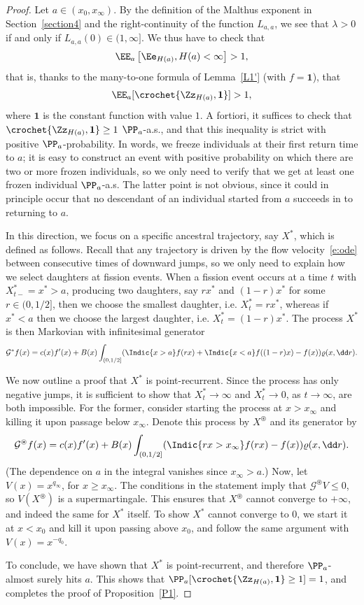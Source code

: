 \begin{proof}
Let $a \in (x_0,x_\infty)$. By the definition of the Malthus exponent in Section~\ref{section4} and the right-continuity of the function $L_{a,a}$, we see that $\lambda>0$ if and only if $L_{a,a}(0)\in(1,\infty]$. We thus have to check that
\[
\EE_a\left[\Ee_{H(a)}, H(a)<\infty\right]>1,
\]
that is, thanks to the many-to-one formula of Lemma~\ref{L1'} (with $f=\mathbf{1}$), that
\[
\EE_a[\crochet{\Zz_{H(a)}, \mathbf{1}}]>1,
\]
where $\mathbf{1}$ is the constant function with value $1$. A fortiori, it suffices to check that $\crochet{\Zz_{H(a)}, \mathbf{1}}\geq 1$ $\PP_a$-a.s., and that this inequality is strict with positive $\PP_a$-probability. In words, we freeze individuals at their first return time to $a$; it is easy to construct an event with positive probability on which there are two or more frozen individuals, so we only need to verify that we get at least one frozen individual $\PP_a$-a.s. The latter point is not obvious, since it could in principle occur that no descendant of an individual started from $a$ succeeds in to returning to $a$.

In this direction, we focus on a specific ancestral trajectory, say $X^*$, which is defined as follows. Recall that any trajectory is driven by the flow velocity~\eqref{e:ode} between consecutive times of downward jumps, so we only need to explain how we select daughters at fission events. When a fission event occurs at a time $t$ with $X^*_{t-}=x^*>a$, producing two daughters, say $rx^*$ and $(1-r)x^*$ for some $r\in(0,1/2]$, then we choose the smallest daughter, i.e. $X^*_t=rx^*$, whereas if $x^*<a$ then we choose the largest daughter, i.e. $X^*_t=(1-r)x^*$. The process $X^*$ is then Markovian with infinitesimal generator
\[
{\mathcal G}^*f(x)=c(x) f'(x) +B(x) \int_{(0,1/2]} (\Indic{x>a} f(rx) + \Indic{x<a}f((1-r)x) -f(x))\varrho(x,\dd r).
\]

We now outline a proof that $X^*$ is point-recurrent. Since the process has only negative jumps, it is sufficient to show that $X^*_t \to \infty$ and $X^*_t \to 0$, as $t\to\infty$, are both impossible. For the former, consider starting the process at $x>x_\infty$ and killing it upon passage below $x_\infty$. Denote this process by $X^\circledast$ and its generator by
\[
{\mathcal G}^\circledast f(x)=c(x) f'(x) +B(x) \int_{(0,1/2]} (\Indic{rx > x_\infty} f(rx) -f(x))\varrho(x,\dd r).
\]
(The dependence on $a$ in the integral vanishes since $x_\infty>a$.) Now, let $V(x) = x^{q_\infty}$, for $x\ge x_\infty$. The conditions in the statement imply that $\mathcal{G}^\circledast V \le 0$, so $V(X^\circledast)$ is a supermartingale. This ensures that $X^\circledast$ cannot converge to $+\infty$, and indeed the same for $X^*$ itself. To show $X^*$ cannot converge to $0$, we start it at $x<x_0$ and kill it upon passing above $x_0$, and follow the same argument with $V(x) = x^{-q_0}$.

To conclude, we have shown that $X^*$ is point-recurrent, and therefore $\PP_a$-almost surely hits $a$. This shows that $\PP_a[\crochet{\Zz_{H(a)}, \mathbf{1}}\geq 1]=1$, and completes the proof of Proposition~\ref{P1}.
\end{proof}
\goodbreak


